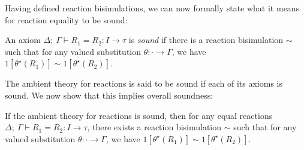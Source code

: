 \noindent Having defined reaction bisimulations, we can now formally state what it means for reaction equality to be sound:

\begin{definition}
An axiom $\Delta; \ \Gamma \vdash R_1 = R_2 : I \to \tau$ is \emph{sound} if there is a reaction bisimulation $\sim$ such that for any valued substitution $\theta : \cdot \to \Gamma$, we have $1[\theta^\star(R_1)] \sim 1[\theta^\star(R_2)]$.
\end{definition}

\noindent The ambient \ipdl theory for reactions is said to be sound if each of its axioms is sound. We now show that this implies overall soundness:

\begin{lemma}
If the ambient \ipdl theory for reactions is sound, then for any equal reactions $\Delta; \ \Gamma \vdash R_1 = R_2 : I \to \tau$,     there exists a reaction bisimulation $\sim$ such that for any valued substitution $\theta : \cdot \to \Gamma$, we have $1[\theta^\star(R_1)] \sim 1[\theta^\star(R_2)]$.
\end{lemma}

